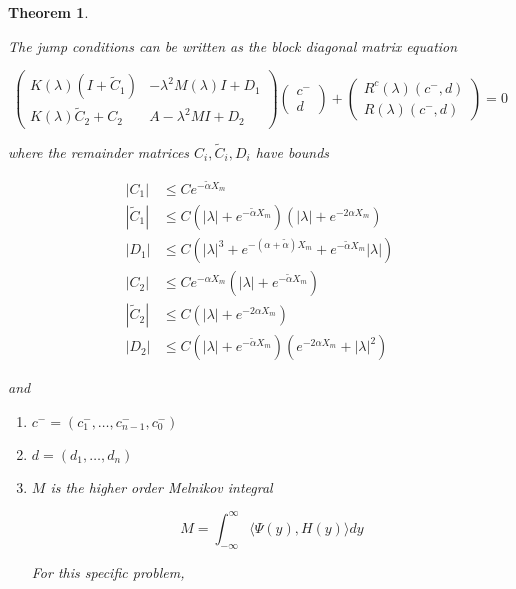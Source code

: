 \documentclass[12pt]{article}
\newtheorem{theorem}{Theorem}
\begin{document}
\begin{theorem}\label{blockmatrixform}

The jump conditions can be written as the block diagonal matrix equation 

\begin{equation}
\begin{pmatrix}
K(\lambda)(I + \tilde{C}_1) & -\lambda^2 M(\lambda) I + D_1 \\
K(\lambda)\tilde{C}_2 + C_2 & A - \lambda^2 MI + D_2
\end{pmatrix}
\begin{pmatrix}c^- \\ d \end{pmatrix} 
+ \begin{pmatrix}
R^c(\lambda)(c^-, d) \\
R(\lambda)(c^-, d)
\end{pmatrix}
= 0
\end{equation}

where the remainder matrices $C_i, \tilde{C}_i, D_i$ have bounds

\begin{align*}
| C_1 | &\leq C e^{-\tilde{\alpha} X_m}  \\
| \tilde{C}_1 | &\leq C (|\lambda| + e^{-\tilde{\alpha} X_m})(|\lambda| + e^{-2 \alpha X_m}) \\
| D_1 | &\leq C (|\lambda|^3 + e^{-(\alpha + \tilde{\alpha}) X_m} + e^{-\tilde{\alpha} X_m} |\lambda| ) \\
| C_2 | &\leq C e^{-\alpha X_m}(|\lambda| + e^{-\tilde{\alpha} X_m} ) \\
| \tilde{C}_2 | &\leq C (|\lambda| + e^{-2 \alpha X_m}) \\
| D_2 | &\leq C (|\lambda| + e^{-\tilde{\alpha} X_m} )( e^{-2 \alpha X_m} + |\lambda|^2)
\end{align*}

and

\begin{enumerate}
\item $c^- = (c_1^-, \dots, c_{n-1}^-, c_0^-)$
\item $d = (d_1, \dots, d_n)$
\item $M$ is the higher order Melnikov integral

\begin{equation}
M =  \int_{-\infty}^\infty \langle \Psi(y), H(y) \rangle dy
\end{equation}

For this specific problem,


\end{enumerate}
\end{theorem}
\end{document}
